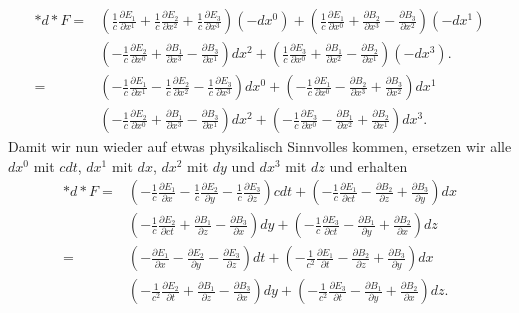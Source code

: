 \begin{align*}
	\ast d \ast F = 
	&\left( \frac{1}{c}\frac{\partial E_1}{\partial x^1} + \frac{1}{c}\frac{\partial E_2}{\partial x^2} + \frac{1}{c}\frac{\partial E_3}{\partial x^3} \right) (-dx^0) +
	\left(\frac{1}{c}\frac{\partial E_1}{\partial x^0} + \frac{\partial B_2}{\partial x^3} - \frac{\partial B_3}{\partial x^2} \right) (-dx^1)\\
	&\left( -\frac{1}{c}\frac{\partial E_2}{\partial x^0} + \frac{\partial B_1}{\partial x^3} - \frac{\partial B_3}{\partial x^1} \right) dx^2 +
	\left( \frac{1}{c}\frac{\partial E_3}{\partial x^0} + \frac{\partial B_1}{\partial x^2} - \frac{\partial B_2}{\partial x^1} \right) (-dx^3).\\
	=
	&\left( -\frac{1}{c}\frac{\partial E_1}{\partial x^1} -\frac{1}{c}\frac{\partial E_2}{\partial x^2} - \frac{1}{c}\frac{\partial E_3}{\partial x^3} \right) dx^0 +
	\left(-\frac{1}{c}\frac{\partial E_1}{\partial x^0} - \frac{\partial B_2}{\partial x^3} + \frac{\partial B_3}{\partial x^2} \right) dx^1\\
	&\left( -\frac{1}{c}\frac{\partial E_2}{\partial x^0} + \frac{\partial B_1}{\partial x^3} - \frac{\partial B_3}{\partial x^1} \right) dx^2 +
	\left( -\frac{1}{c}\frac{\partial E_3}{\partial x^0} - \frac{\partial B_1}{\partial x^2} + \frac{\partial B_2}{\partial x^1} \right) dx^3.
\end{align*}
Damit wir nun wieder auf etwas physikalisch Sinnvolles kommen, ersetzen wir alle $dx^0$ mit $cdt$, $dx^1$ mit $dx$, $dx^2$ mit $dy$ und $dx^3$ mit $dz$ und erhalten
\begin{align*}
	\ast d \ast F = 
	&\left( -\frac{1}{c}\frac{\partial E_1}{\partial x} -\frac{1}{c}\frac{\partial E_2}{\partial y} - \frac{1}{c}\frac{\partial E_3}{\partial z} \right) cdt +
	\left(-\frac{1}{c}\frac{\partial E_1}{\partial ct} - \frac{\partial B_2}{\partial z} + \frac{\partial B_3}{\partial y} \right) dx\\
	&\left( -\frac{1}{c}\frac{\partial E_2}{\partial ct} + \frac{\partial B_1}{\partial z} - \frac{\partial B_3}{\partial x} \right) dy +
	\left( -\frac{1}{c}\frac{\partial E_3}{\partial ct} - \frac{\partial B_1}{\partial y} + \frac{\partial B_2}{\partial x} \right) dz\\
	=&\left( -\frac{\partial E_1}{\partial x} -\frac{\partial E_2}{\partial y} - \frac{\partial E_3}{\partial z} \right) dt +
	\left(-\frac{1}{c^2}\frac{\partial E_1}{\partial t} - \frac{\partial B_2}{\partial z} + \frac{\partial B_3}{\partial y} \right) dx\\
	&\left( -\frac{1}{c^2}\frac{\partial E_2}{\partial t} + \frac{\partial B_1}{\partial z} - \frac{\partial B_3}{\partial x} \right) dy +
	\left( -\frac{1}{c^2}\frac{\partial E_3}{\partial t} - \frac{\partial B_1}{\partial y} + \frac{\partial B_2}{\partial x} \right) dz.
\end{align*}
